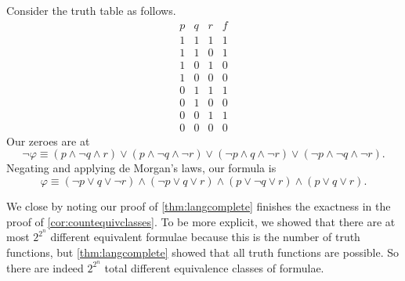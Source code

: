 \documentclass[../notes.tex]{subfiles}
\begin{document}
\begin{example}
	Consider the truth table as follows.
	\[\begin{array}{c|c|c||c}
		p & q & r & f \\
		\hline
		1 & 1 & 1 & 1 \\
		1 & 1 & 0 & 1 \\
		1 & 0 & 1 & 0 \\
		1 & 0 & 0 & 0 \\
		0 & 1 & 1 & 1 \\
		0 & 1 & 0 & 0 \\
		0 & 0 & 1 & 1 \\
		0 & 0 & 0 & 0
	\end{array}\]
	Our zeroes are at
	\[\lnot\varphi\equiv(p\land\lnot q\land r)\lor(p\land\lnot q\land\lnot r)\lor(\lnot p\land q\land\lnot r)\lor(\lnot p\land\lnot q\land\lnot r).\]
	Negating and applying de Morgan's laws, our formula is
	\[\varphi\equiv(\lnot p\lor q\lor\lnot r)\land(\lnot p\lor q\lor r)\land( p\lor\lnot q\lor r)\land( p\lor q\lor r).\]
\end{example}

We close by noting our proof of \autoref{thm:langcomplete} finishes the exactness in the proof of \autoref{cor:countequivclasses}. To be more explicit, we showed that there are at most $2^{2^n}$ different equivalent formulae because this is the number of truth functions, but \autoref{thm:langcomplete} showed that all truth functions are possible. So there are indeed $2^{2^n}$ total different equivalence classes of formulae.
\end{document}
